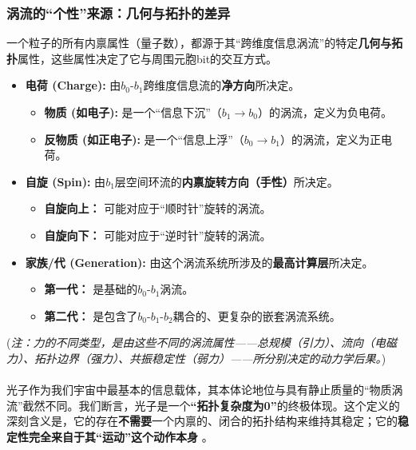 \documentclass[11pt, a4paper]{article}
\begin{document}
\subsubsection{涡流的“个性”来源：几何与拓扑的差异}
一个粒子的所有内禀属性（量子数），都源于其“跨维度信息涡流”的特定\textbf{几何与拓扑}属性，这些属性决定了它与周围元胞bit的交互方式。

\begin{itemize}
    \item \textbf{电荷 (Charge):} 由$b_0$-$b_1$跨维度信息流的\textbf{净方向}所决定。
    \begin{itemize}
        \item \textbf{物质 (如电子):} 是一个“信息下沉”（$b_1 \rightarrow b_0$）的涡流，定义为负电荷。
        \item \textbf{反物质 (如正电子):} 是一个“信息上浮”（$b_0 \rightarrow b_1$）的涡流，定义为正电荷。
    \end{itemize}

    \item \textbf{自旋 (Spin):} 由$b_1$层空间环流的\textbf{内禀旋转方向（手性）}所决定。
    \begin{itemize}
        \item \textbf{自旋向上：} 可能对应于“顺时针”旋转的涡流。
        \item \textbf{自旋向下：} 可能对应于“逆时针”旋转的涡流。
    \end{itemize}

    \item \textbf{家族/代 (Generation):} 由这个涡流系统所涉及的\textbf{最高计算层}所决定。
    \begin{itemize}
        \item \textbf{第一代：} 是基础的$b_0$-$b_1$涡流。
        \item \textbf{第二代：} 是包含了$b_0$-$b_1$-$b_2$耦合的、更复杂的嵌套涡流系统。
    \end{itemize}
\end{itemize}

(\textit{注：力的不同类型，是由这些不同的涡流属性——总规模（引力）、流向（电磁力）、拓扑边界（强力）、共振稳定性（弱力）——所分别决定的动力学后果。})

\paragraph{}
光子作为我们宇宙中最基本的信息载体，其本体论地位与具有静止质量的“物质涡流”截然不同。我们断言，光子是一个\textbf{“拓扑复杂度为0”}的终极体现。这个定义的深刻含义是，它的存在\textbf{不需要}一个内禀的、闭合的拓扑结构来维持其稳定；它的\textbf{稳定性完全来自于其“运动”这个动作本身} \cite{deBroglie1930}。
\end{document}
